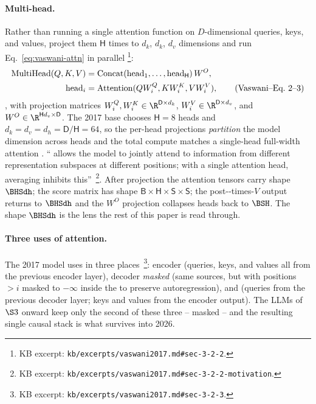 \paragraph{Multi-head.} Rather than running a single attention
function on $D$-dimensional queries, keys, and values,
\citet{vaswani2017} project them $\mathsf{H}$ times to $d_k$, $d_k$,
$d_v$ dimensions and run Eq.~\eqref{eq:vaswani-attn} in
parallel%
\footnote{KB excerpt: \nolinkurl{kb/excerpts/vaswani2017.md#sec-3-2-2}.}:
\begin{align}
  \mathrm{MultiHead}(Q, K, V)
   &= \mathrm{Concat}(\mathrm{head}_1, \ldots, \mathrm{head}_{\mathsf{H}})\, W^O,
   \notag \\
  \mathrm{head}_i
   &= \mathrm{Attention}(Q W_i^Q, K W_i^K, V W_i^V),
   \tag{Vaswani--Eq.~2--3}
  \label{eq:vaswani-multihead}
\end{align}
\citep[\S 3.2.2, Eq.~2--3]{vaswani2017}, with projection matrices
$W_i^Q, W_i^K \in \R^{\mathsf{D} \times d_k}$,
$W_i^V \in \R^{\mathsf{D} \times d_v}$, and
$W^O \in \R^{\mathsf{H} d_v \times \mathsf{D}}$. The 2017 base
chooses $\mathsf{H} = 8$ heads and
$d_k = d_v = d_h = \mathsf{D}/\mathsf{H} = 64$, so the per-head
projections \emph{partition} the model dimension across heads and
the total compute matches a single-head full-width attention
\citep[\S 3.2.2]{vaswani2017}. `` allows the
model to jointly attend to information from different
representation subspaces at different positions; with a single
attention head, averaging inhibits this''~\citep[\S
3.2.2]{vaswani2017}\footnote{KB excerpt: \nolinkurl{kb/excerpts/vaswani2017.md#sec-3-2-2-motivation}.}.
After projection the attention tensors carry shape $\BHSdh$; the
score matrix has shape
$\mathsf{B}\!\times\!\mathsf{H}\!\times\!\mathsf{S}\!\times\!\mathsf{S}$;
the post--times-$V$ output returns to $\BHSdh$ and the
$W^O$ projection collapses heads back to $\BSH$. The shape
$\BHSdh$ is the lens the rest of this paper is read through.

\paragraph{Three uses of attention.} The 2017 model uses
 in three places~\citep[\S
3.2.3]{vaswani2017}\footnote{KB excerpt: \nolinkurl{kb/excerpts/vaswani2017.md#sec-3-2-3}.}:
encoder  (queries, keys, and values all from the
previous encoder layer), decoder \emph{masked}  (same
sources, but with positions $> i$ masked to $-\infty$ inside the
 to preserve autoregression), and 
 (queries from the previous decoder layer; keys and
values from the encoder output). The  LLMs of $\S 3$
onward keep only the second of these three -- masked 
-- and the resulting single causal stack is what survives into
2026.

